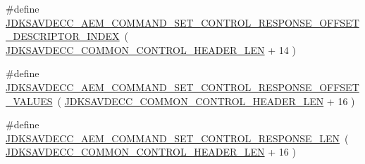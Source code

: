 \begin{DoxyCompactItemize}
\#define \hyperlink{group__command__set__control__response_ga6efea81758fd4c87622897789ba516fc}{J\+D\+K\+S\+A\+V\+D\+E\+C\+C\+\_\+\+A\+E\+M\+\_\+\+C\+O\+M\+M\+A\+N\+D\+\_\+\+S\+E\+T\+\_\+\+C\+O\+N\+T\+R\+O\+L\+\_\+\+R\+E\+S\+P\+O\+N\+S\+E\+\_\+\+O\+F\+F\+S\+E\+T\+\_\+\+D\+E\+S\+C\+R\+I\+P\+T\+O\+R\+\_\+\+I\+N\+D\+EX}~( \hyperlink{group__jdksavdecc__avtp__common__control__header_gaae84052886fb1bb42f3bc5f85b741dff}{J\+D\+K\+S\+A\+V\+D\+E\+C\+C\+\_\+\+C\+O\+M\+M\+O\+N\+\_\+\+C\+O\+N\+T\+R\+O\+L\+\_\+\+H\+E\+A\+D\+E\+R\+\_\+\+L\+EN} + 14 )
\item 
\#define \hyperlink{group__command__set__control__response_ga74187c33c75dea34a644a509e1cc2bfe}{J\+D\+K\+S\+A\+V\+D\+E\+C\+C\+\_\+\+A\+E\+M\+\_\+\+C\+O\+M\+M\+A\+N\+D\+\_\+\+S\+E\+T\+\_\+\+C\+O\+N\+T\+R\+O\+L\+\_\+\+R\+E\+S\+P\+O\+N\+S\+E\+\_\+\+O\+F\+F\+S\+E\+T\+\_\+\+V\+A\+L\+U\+ES}~( \hyperlink{group__jdksavdecc__avtp__common__control__header_gaae84052886fb1bb42f3bc5f85b741dff}{J\+D\+K\+S\+A\+V\+D\+E\+C\+C\+\_\+\+C\+O\+M\+M\+O\+N\+\_\+\+C\+O\+N\+T\+R\+O\+L\+\_\+\+H\+E\+A\+D\+E\+R\+\_\+\+L\+EN} + 16 )
\item 
\#define \hyperlink{group__command__set__control__response_gad54c9d8dd021fce5cb24c880401d316f}{J\+D\+K\+S\+A\+V\+D\+E\+C\+C\+\_\+\+A\+E\+M\+\_\+\+C\+O\+M\+M\+A\+N\+D\+\_\+\+S\+E\+T\+\_\+\+C\+O\+N\+T\+R\+O\+L\+\_\+\+R\+E\+S\+P\+O\+N\+S\+E\+\_\+\+L\+EN}~( \hyperlink{group__jdksavdecc__avtp__common__control__header_gaae84052886fb1bb42f3bc5f85b741dff}{J\+D\+K\+S\+A\+V\+D\+E\+C\+C\+\_\+\+C\+O\+M\+M\+O\+N\+\_\+\+C\+O\+N\+T\+R\+O\+L\+\_\+\+H\+E\+A\+D\+E\+R\+\_\+\+L\+EN} + 16 )
\end{DoxyCompactItemize}
